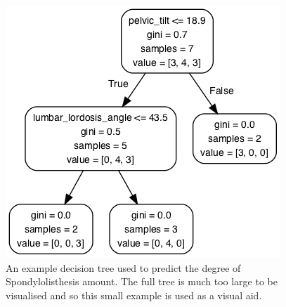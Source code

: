 \documentclass[10pt]{article}
\begin{document}
\begin{figure}
\begin{center}
\includegraphics[scale=0.4,angle=0,trim=8cm 0cm 0cm 0cm]{small_tree_0_0.png}
\caption{An example decision tree used to predict the degree of Spondylolisthesis amount. The full tree is much too large to be visualised and so this small example is used as a visual aid.}
\label{fig_smalltree}
\end{center}
\end{figure} 


\end{document}
